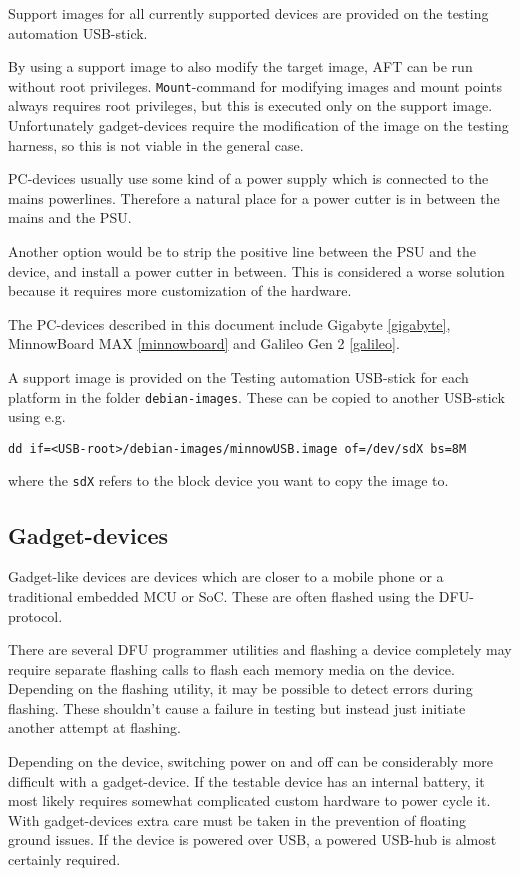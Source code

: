\documentclass[a4paper,11pt]{article}
\newcommand{\cmd}[1]{\texttt{#1}}
\begin{document}
Support images for all currently supported devices are provided on the testing automation USB-stick.

By using a support image to also modify the target image, AFT can be run without root privileges. \cmd{Mount}-command for modifying images and mount points always requires root privileges, but this is executed only on the support image. Unfortunately gadget-devices require the modification of the image on the testing harness, so this is not viable in the general case.

PC-devices usually use some kind of a power supply which is connected to the mains powerlines. Therefore a natural place for a power cutter is in between the mains and the PSU.

Another option would be to strip the positive line between the PSU and the device, and install a power cutter in between. This is considered a worse solution because it requires more customization of the hardware.

The PC-devices described in this document include Gigabyte \ref{gigabyte}, MinnowBoard MAX \ref{minnowboard} and Galileo Gen 2 \ref{galileo}. 

A support image is provided on the Testing automation USB-stick for each platform in the folder \cmd{debian-images}. These can be copied to another USB-stick using e.g.
\begin{lstlisting}
dd if=<USB-root>/debian-images/minnowUSB.image of=/dev/sdX bs=8M
\end{lstlisting}
where the \cmd{sdX} refers to the block device you want to copy the image to.

\subsection{Gadget-devices}

Gadget-like devices are devices which are closer to a mobile phone or a traditional embedded MCU or SoC. These are often flashed using the DFU-protocol.

There are several DFU programmer utilities and flashing a device completely may require separate flashing calls to flash each memory media on the device. Depending on the flashing utility, it may be possible to detect errors during flashing. These shouldn't cause a failure in testing but instead just initiate another attempt at flashing.

Depending on the device, switching power on and off can be considerably more difficult with a gadget-device. If the testable device has an internal battery, it most likely requires somewhat complicated custom hardware to power cycle it. With gadget-devices extra care must be taken in the prevention of floating ground issues. If the device is powered over USB, a powered USB-hub is almost certainly required.
\end{document}
